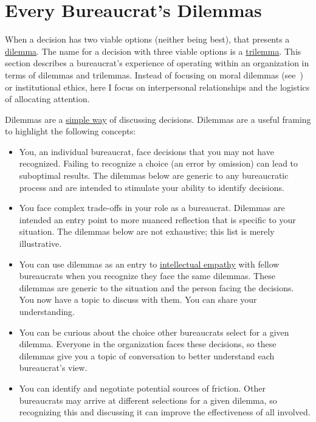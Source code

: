 \section{Every Bureaucrat's  Dilemmas\label{sec:dilemma-trilemma}}



When a decision has two viable options (neither being best), that presents a \href{https://en.wikipedia.org/wiki/Dilemma}{dilemma}. The name for a decision with three viable options is a \href{https://en.wikipedia.org/wiki/Trilemma}{trilemma}. This section describes a bureaucrat's experience of operating within an organization in terms of dilemmas and trilemmas. Instead of focusing on moral dilemmas (see~\cite{2017_Zacka}) or institutional ethics, here I focus on interpersonal relationships and the logistics of allocating attention. 

Dilemmas are a \href{https://en.wikipedia.org/wiki/Defeasible_reasoning}{simple way} of discussing decisions. %
Dilemmas are a useful framing to highlight the following concepts:
\begin{itemize}
    \item You, an individual bureaucrat, face decisions that you may not have recognized. Failing to recognize a choice (an error by omission) can lead to suboptimal results. The dilemmas below are generic to any bureaucratic process and are intended to stimulate your ability to identify decisions. 
    \item You face complex trade-offs in your role as a bureaucrat. Dilemmas are intended an entry point to more nuanced reflection that is specific to your situation. The dilemmas below are not exhaustive; this list is merely illustrative. 
    \item You can use dilemmas as an entry to \href{https://en.wikipedia.org/wiki/Theory_of_mind}{intellectual empathy} with fellow bureaucrats when you recognize they face the same dilemmas. These dilemmas are generic to the situation and the person facing the decisions. You now have a topic to discuss with them. You can share your understanding. 
    \item You can be curious about the choice other bureaucrats select for a given dilemma. Everyone in the organization faces these decisions, so these dilemmas give you a topic of conversation to better understand each bureaucrat's view.
    \item You can identify and negotiate potential sources of friction. Other bureaucrats may arrive at different selections for a given dilemma, so recognizing this and discussing it can improve the effectiveness of all involved.
\end{itemize}


